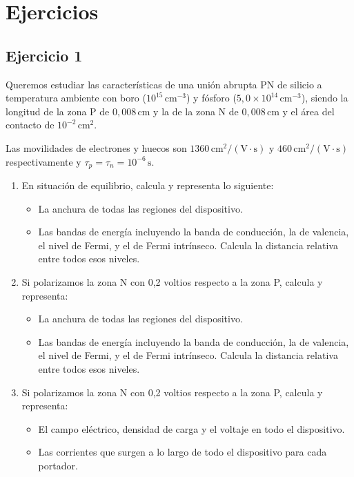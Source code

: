 \newpage

\section{Ejercicios}


\subsection{Ejercicio 1}

Queremos estudiar las características de una unión abrupta PN de silicio a temperatura ambiente con boro (\(10^{15} \, \text{cm}^{-3}\)) y fósforo (\(5,0 \times 10^{14} \, \text{cm}^{-3}\)), siendo la longitud de la zona P de \(0,008 \, \text{cm}\) y la de la zona N de \(0,008 \, \text{cm}\) y el área del contacto de \(10^{-2} \, \text{cm}^2\). 

Las movilidades de electrones y huecos son \(1360 \, \text{cm}^2/(\text{V}\cdot\text{s})\) y \(460 \, \text{cm}^2/(\text{V}\cdot\text{s})\) respectivamente y \(\tau_p = \tau_n = 10^{-6} \, \text{s}\).

\begin{enumerate}[label=\alph*)]
\item En situación de equilibrio, calcula y representa lo siguiente:
\begin{itemize}
    \item La anchura de todas las regiones del dispositivo.
    \item Las bandas de energía incluyendo la banda de conducción, la de valencia, el nivel de Fermi, y el de Fermi intrínseco. Calcula la distancia relativa entre todos esos niveles.
\end{itemize}

\item Si polarizamos la zona N con 0,2 voltios respecto a la zona P, calcula y representa:
\begin{itemize}
    \item La anchura de todas las regiones del dispositivo.
    \item Las bandas de energía incluyendo la banda de conducción, la de valencia, el nivel de Fermi, y el de Fermi intrínseco. Calcula la distancia relativa entre todos esos niveles.
\end{itemize}

\item Si polarizamos la zona N con 0,2 voltios respecto a la zona P, calcula y representa:
\begin{itemize}
    \item El campo eléctrico, densidad de carga y el voltaje en todo el dispositivo.
    \item Las corrientes que surgen a lo largo de todo el dispositivo para cada portador.
\end{itemize}
\end{enumerate}


